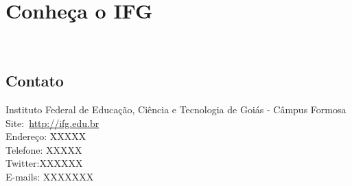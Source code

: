\documentclass[11pt,fleqn]{book} %
\begin{document}
\chapter{Conheça o IFG}\label{conheca}
\vspace{6em}
\begin{flushright}
	\textit{\textcolor{white}{Um bonita citação...}}
\end{flushright}
\vspace{12em}

\section{Contato}

Instituto Federal de Educação, Ciência e Tecnologia de Goiás - Câmpus Formosa\\
Site:~\url{http://ifg.edu.br}\\
Endereço: XXXXX\\
Telefone: XXXXX \\
Twitter:XXXXXX \\
E-mails: XXXXXXX





%
\end{document}
